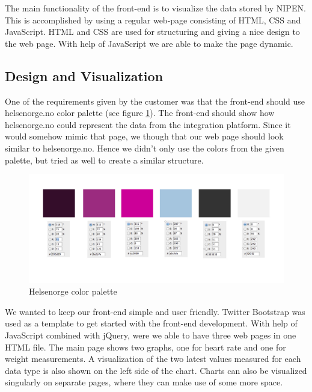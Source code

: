 The main functionality of the front-end is to visualize the data stored by NIPEN.%
This is accomplished by using a regular web-page consisting of HTML, CSS and JavaScript. HTML and CSS are used for structuring and giving a nice design to the web page. With help of JavaScript we are able to make the page dynamic.

\subsection{Design and Visualization}

One of the requirements given by the customer was that the front-end should use helsenorge.no color palette
(see figure \ref{figure:helsenorge-color-palette}).
The front-end should show how helsenorge.no could represent the data from the integration platform. 
Since it would somehow mimic that page, we though that our web page should look similar to helsenorge.no. 
Hence we didn't only use the colors from the given palette, but tried as well to create a similar structure.

\begin{figure}[h]
\centering
\includegraphics[scale=0.30]{../Figures/helsenorge_pallett.jpg}
\caption{Helsenorge color palette}
\label{figure:helsenorge-color-palette}
\end{figure}

We wanted to keep our front-end simple and user friendly.
Twitter Bootstrap was used as a template to get started with the front-end development.
With help of JavaScript combined with jQuery, were we able to have three web pages in one HTML file. 
The main page shows two graphs, one for heart rate and one for weight measurements. 
A visualization of the two latest values measured for each data type is also shown on the left side of the chart.
Charts can also be visualized singularly on separate pages, where they can make use of some more space.

